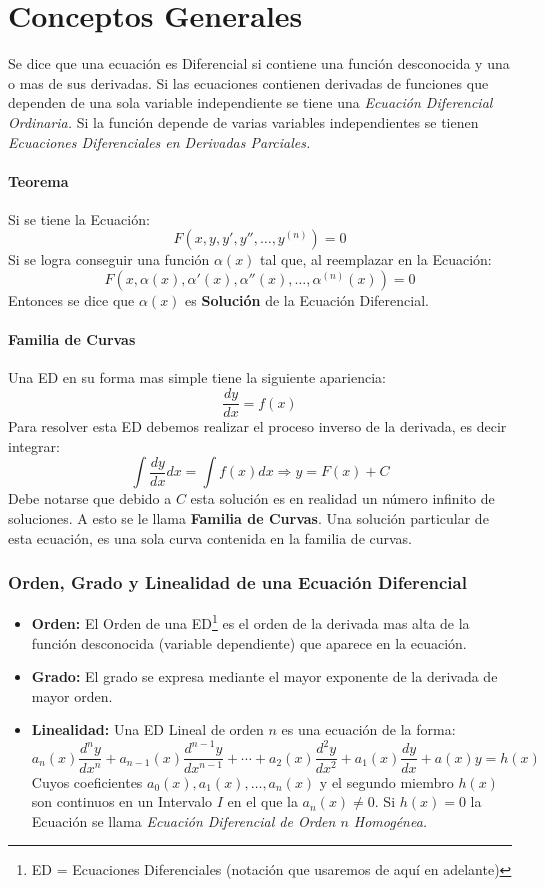 \chapter{Conceptos Generales}
Se dice que una ecuación es Diferencial si contiene una función desconocida y una o mas de sus derivadas. Si las ecuaciones contienen derivadas de funciones que dependen de una sola variable independiente se tiene una \textit{Ecuación Diferencial Ordinaria.} Si la función depende de varias variables independientes se tienen \textit{Ecuaciones Diferenciales en Derivadas Parciales.}

\subsubsection{Teorema}
Si se tiene la Ecuación:
$$F(x,y,y',y'',\ldots,y^{(n)})=0$$
Si se logra conseguir una función $\alpha(x)$ tal que, al reemplazar en la Ecuación:
$$F(x,\alpha(x),\alpha'(x),\alpha''(x),\ldots,\alpha^{(n)}(x))=0$$
Entonces se dice que $\alpha(x)$ es \textbf{Solución} de la Ecuación Diferencial.
\subsubsection*{Familia de Curvas}
Una ED en su forma mas simple tiene la siguiente apariencia:
$$\dfrac{dy}{dx}=f(x)$$
Para resolver esta ED debemos realizar el proceso inverso de la derivada, es decir integrar:
$$\int\dfrac{dy}{dx}dx=\int f(x) dx\Rightarrow y=F(x)+C$$
Debe notarse que debido a $C$ esta solución es en realidad un número infinito de soluciones. A esto se le llama \textbf{Familia de Curvas}. Una solución particular de esta ecuación, es una sola curva contenida en la familia de curvas.
\subsection*{Orden, Grado y Linealidad de una Ecuación Diferencial}
\begin{itemize}
\item \textbf{Orden:} El Orden de una ED\footnote{ED = Ecuaciones Diferenciales (notación que usaremos de aquí en adelante)} es el orden de la derivada mas alta de la función desconocida (variable dependiente) que aparece en la ecuación.
\item \textbf{Grado:} El grado se expresa mediante el mayor exponente de la derivada de mayor orden.
\item \textbf{Linealidad:} Una ED Lineal de orden $n$ es una ecuación de la forma:
$$a_n(x)\dfrac{d^ny}{dx^n}+a_{n-1}(x)\dfrac{d^{n-1}y}{dx^{n-1}}+\cdots + a_2(x)\dfrac{d^2y}{dx^2}+a_1(x)\dfrac{dy}{dx}+a(x)y=h(x)$$
Cuyos coeficientes $a_0(x),a_1(x),\ldots,a_n(x)$ y el segundo miembro $h(x)$ son continuos en un Intervalo $I$ en el que la $a_n(x)\neq 0$. Si $h(x)=0$ la Ecuación se llama \textit{Ecuación Diferencial de Orden $n$ Homogénea.}
\end{itemize}